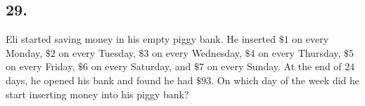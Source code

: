 \documentclass[12pt]{article}
\begin{document}
\begin{answer}
%
\end{answer}


\subsection*{29.}
Eli started saving money in his empty piggy bank. He inserted $\$1$ on every Monday, $\$2$ on every Tuesday, $\$3$ on every Wednesday, $\$4$ on every Thursday, $\$5$ on every Friday, $\$6$ on every Saturday, and $\$7$ on every Sunday. At the end of $24$ days, he opened his bank and found he had $\$93$. On which day of the week did he start inserting money into his piggy bank?

\nopagebreak

\fbox{\phantom{ANSWER}}
\end{document}
